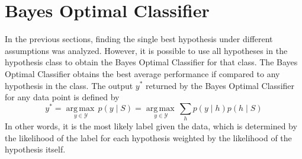 \documentclass[12pt]{article}
\newcommand{\argmax}[1]{\underset{#1}{\operatorname{arg\,max\,}}}
\begin{document}
\section{Bayes Optimal Classifier}

In the previous sections, finding the single best hypothesis under different assumptions was analyzed. However, it is possible to use all hypotheses in the hypothesis class to obtain the Bayes Optimal Classifier for that class. The Bayes Optimal Classifier obtains the best average performance if compared to any hypothesis in the class. The output $y^*$ returned by the Bayes Optimal Classifier for any data point is defined by
\[ y^* = \argmax{y\in\mathcal{Y}}p(y \mid S) = \argmax{y\in\mathcal{Y}}\sum_{h}p(y \mid h)p(h \mid S) \]
In other words, it is the most likely label given the data, which is determined by the likelihood of the label for each hypothesis weighted by the likelihood of the hypothesis itself.
\end{document}
